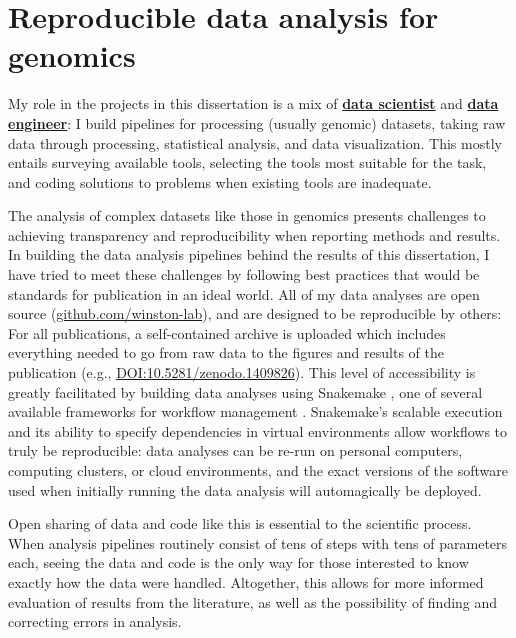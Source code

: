 \section{Reproducible data analysis for genomics}

My role in the projects in this dissertation is a mix of \href{https://blog.insightdatascience.com/data-science-vs-data-engineering-62da7678adaa}{\textbf{data scientist}} and \href{https://blog.insightdatascience.com/data-science-vs-data-engineering-62da7678adaa}{\textbf{data engineer}}: I build pipelines for processing (usually genomic) datasets, taking raw data through processing, statistical analysis, and data visualization.
This mostly entails surveying available tools, selecting the tools most suitable for the task, and coding solutions to problems when existing tools are inadequate.

The analysis of complex datasets like those in genomics presents challenges to achieving transparency and reproducibility when reporting methods and results.
In building the data analysis pipelines behind the results of this dissertation, I have tried to meet these challenges by following best practices that would be standards for publication in an ideal world.
All of my data analyses are open source (\href{https://github.com/winston-lab}{github.com/winston-lab}), and are designed to be reproducible by others: For all publications, a self-contained archive is uploaded which includes everything needed to go from raw data to the figures and results of the publication (e.g., \href{https://doi.org/10.5281/zenodo.1409826}{DOI:10.5281/zenodo.1409826}).
This level of accessibility is greatly facilitated by building data analyses using Snakemake \citep{koster2012}, one of several available frameworks for workflow management \citep{voss2017, ditommaso2017}.
Snakemake's scalable execution and its ability to specify dependencies in virtual environments allow workflows to truly be reproducible: data analyses can be re-run on personal computers, computing clusters, or cloud environments, and the exact versions of the software used when initially running the data analysis will automagically be deployed.

Open sharing of data and code like this is essential to the scientific process.
When analysis pipelines routinely consist of tens of steps with tens of parameters each, seeing the data and code is the only way for those interested to know exactly how the data were handled.
Altogether, this allows for more informed evaluation of results from the literature, as well as the possibility of finding and correcting errors in analysis.

\clearpage

\begingroup
    \singlespacing
    
\endgroup

